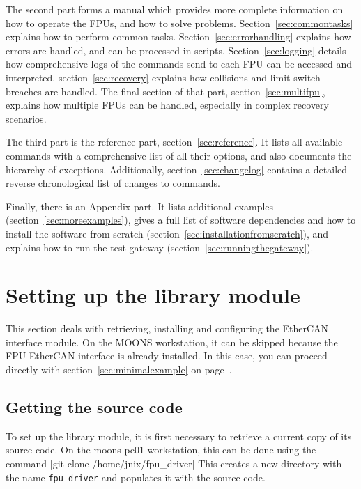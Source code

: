 \documentclass[11pt,a4paper]{scrartcl}
\begin{document}
The second part forms a manual which provides more complete
information on how to operate the FPUs, and how to solve
problems. Section~\ref{sec:commontasks} explains how to perform common
tasks. Section~\ref{sec:errorhandling} explains how errors are
handled, and can be processed in scripts. Section~\ref{sec:logging}
details how comprehensive logs of the commands send to each FPU can be
accessed and interpreted. section~\ref{sec:recovery} explains how
collisions and limit switch breaches are handled. The final section
of that part, section~\ref{sec:multifpu}, explains how multiple FPUs
can be handled, especially in complex recovery scenarios.

The third part is the reference part, section~\ref{sec:reference}.
It lists all available commands with a comprehensive list of all their
options, and also documents the hierarchy of exceptions.
Additionally, section~\ref{sec:changelog} contains a detailed reverse
chronological list of changes to commands.

Finally, there is an Appendix part. It lists additional examples
(section~\ref{sec:moreexamples}), gives a full list of software
dependencies and how to install the software from scratch
(section~\ref{sec:installationfromscratch}), and explains how to run
the test gateway (section~\ref{sec:runningthegateway}).

\section{Setting up the library module}
\label{sec:settingup}

This section deals with retrieving, installing and configuring the
EtherCAN interface module. On the MOONS workstation, it can be skipped because the
FPU EtherCAN interface is already installed.  In this case, you can proceed
directly with section~\ref{sec:minimalexample} on
page~\pageref{sec:minimalexample}.

\subsection{Getting the source code}

To set up the library module, it is first
necessary to retrieve a current copy of its source code.
On the moons-pc01 workstation, this can be done using the
command |git clone /home/jnix/fpu_driver|
This creates a new directory with the name \texttt{fpu\_driver}
and populates it with the source code.
\end{document}
